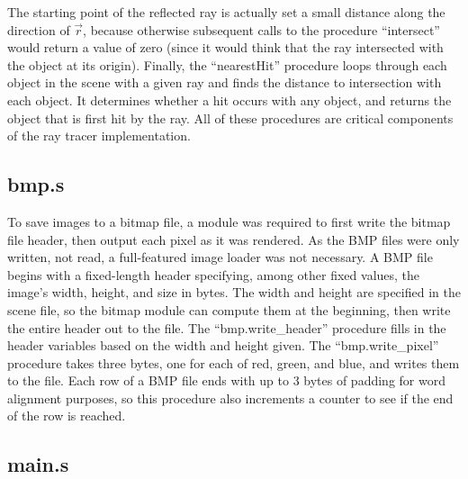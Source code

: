 \documentclass[10pt]{article}
\begin{document}
\smallskip
The starting point of the reflected ray is actually set a small
distance along the direction of $\vec{r}$, because otherwise subsequent
calls to the procedure ``intersect'' would return a value of zero
(since it would think that the ray intersected with the object at
its origin). Finally, the ``nearestHit'' procedure loops through
each object in the scene with a given ray and finds the distance to
intersection with each object. It determines whether a hit occurs
with any object, and returns the object that is first hit by the ray.
All of these procedures are critical components of the ray tracer
implementation.

\subsection{bmp.s}

To save images to a bitmap file, a module was required to first write
the bitmap file header, then output each pixel as it was rendered.
As the BMP files were only written, not read, a full-featured image
loader was not necessary. A BMP file begins with a fixed-length header
specifying, among other fixed values, the image's width, height, and
size in bytes. The width and height are specified in the scene file,
so the bitmap module can compute them at the beginning, then write the
entire header out to the file. The ``bmp.write\_header'' procedure
fills in the header variables based on the width and height given. The
``bmp.write\_pixel'' procedure takes three bytes, one for each of red,
green, and blue, and writes them to the file. Each row of a BMP file
ends with up to 3 bytes of padding for word alignment purposes, so this
procedure also increments a counter to see if the end of the row is
reached.

\subsection{main.s}
\end{document}
